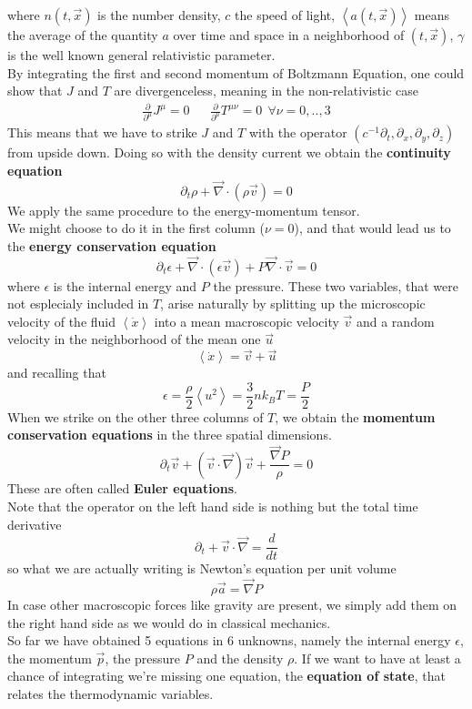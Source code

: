 \documentclass[11pt]{article}
\numberwithin{equation}{section}
\begin{document}
where $n(t, \vec{x})$ is the number density, $c$ the speed of light,  $\left< a(t,\vec{x}) \right>$ means the average of the quantity $a$ over time and space in a neighborhood of $(t, \vec{x})$, $\gamma$ is the well known general relativistic parameter.\\
By integrating the first and second momentum of Boltzmann Equation, one could show that $J$ and $T$ are divergenceless, meaning in the non-relativistic case
\begin{align}
\frac{\partial }{\partial^{\mu}}J^{\mu}=0 && \frac{\partial }{\partial^{\mu}}T^{\mu \nu}=0 \  \  \forall \nu =0,..,3 
\end{align}
This means that we have to strike $J$ and $T$ with the operator $(c^{-1}\partial_t,\partial_x,\partial_y,\partial_z)$ from upside down. Doing so with the density current we obtain the \textbf{continuity equation}
\begin{equation} \label{cont}
\partial_t \rho + \vec\nabla \cdot (\rho \vec{v})=0
\end{equation}
We apply the same procedure to the energy-momentum tensor.\\
We might choose to do it in the first column ($\nu=0$), and that would lead us to the \textbf{energy conservation equation}
\begin{equation} \label{consen}
\partial_t \epsilon + \vec \nabla \cdot (\epsilon \vec{v}) + P\vec \nabla \cdot \vec{v}=0
\end{equation}
where $\epsilon$ is the internal energy and $P$ the pressure. These two variables, that were not esplecialy included in $T$, arise naturally by splitting up the microscopic velocity of the fluid $\left <  \dot{x} \right >$ into a mean macroscopic velocity $\vec{v}$ and a random velocity in the neighborhood of the mean one $\vec{u}$
$$\left <  \dot{x} \right >= \vec{v}  +  \vec{u} $$
and recalling that 
$$\epsilon = \frac{\rho}{2} \left <  u^2 \right > = \frac{3}{2} n k_B T= \frac{P}{2}$$
When we strike on the other three columns of $T$, we obtain the \textbf{momentum conservation equations} in the three spatial dimensions.
\begin{equation} \label{euler}
\partial_t \vec{v} + (\vec{v} \cdot \vec \nabla) \vec{v} + \frac{\vec \nabla P}{\rho}=0
\end{equation}
These are often called \textbf{Euler equations}. \\
Note that the operator on the left hand side is nothing but the total time derivative
$$
\partial_t + \vec{v} \cdot \vec \nabla = \frac{d}{dt}
$$
so what we are actually writing is Newton's equation per unit volume
$$
\rho \vec{a} = \vec \nabla P
$$
In case other macroscopic forces like gravity are present, we simply add them on the right hand side as we would do in classical mechanics. \\
So far we have obtained 5 equations in 6 unknowns, namely the internal energy $\epsilon$, the momentum $\vec{p}$, the pressure $P$ and the density $\rho$. If we want to have at least a chance of integrating we're missing one equation, the \textbf{equation of state}, that relates the thermodynamic variables.
\end{document}
